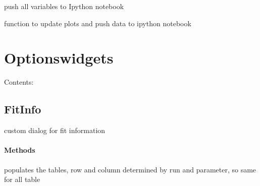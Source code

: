 \documentclass[letterpaper,10pt,english]{sphinxmanual}
\begin{document}
\begin{fulllineitems}
\begin{fulllineitems}
\label{MainWindow:SpinorMonitor.MainWindow.to_ipy}
push all variables to Ipython notebook

\end{fulllineitems}


\begin{fulllineitems}
\label{MainWindow:SpinorMonitor.MainWindow.update_data}
function to update plots and push data to ipython notebook

\end{fulllineitems}


\end{fulllineitems}



\section{Optionswidgets}
\label{Optionswidgets::doc}\label{Optionswidgets:optionswidgets}
Contents:


\subsection{FitInfo}
\label{FitInfo::doc}\label{FitInfo:fitinfo}

\begin{fulllineitems}
\label{FitInfo:Optionswidgets.FitInfo}
custom dialog for fit information
\paragraph{Methods}

\begin{fulllineitems}
\label{FitInfo:Optionswidgets.FitInfo.close}
\end{fulllineitems}


\begin{fulllineitems}
\label{FitInfo:Optionswidgets.FitInfo.parse_params}
populates the tables, row and column determined by run and
parameter, so same for all table

\end{fulllineitems}


\end{fulllineitems}
\end{document}
